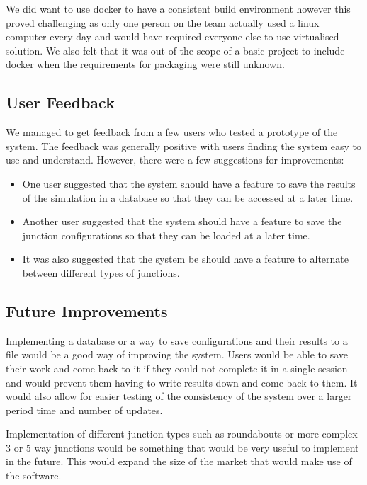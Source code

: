 \documentclass{article}
\begin{document}
    We did want to use docker to have a consistent build environment however this proved challenging as only one person
    on the team actually used a linux computer every day and would have required everyone else to use virtualised solution.
    We also felt that it was out of the scope of a basic project to include docker when the requirements for packaging were
    still unknown.

    \subsection{User Feedback}

    We managed to get feedback from a few users who tested a prototype of the system. The feedback was generally positive with users finding the system easy to use and understand. However, there were a few suggestions for improvements:

    \begin{itemize}
        \item One user suggested that the system should have a feature to save the results of the simulation in a database so that they can be accessed at a later time.
        \item Another user suggested that the system should have a feature to save the junction configurations so that they can be loaded at a later time.
        \item It was also suggested that the system be should have a feature to alternate between different types of junctions.
    \end{itemize}

    \subsection{Future Improvements}

    Implementing a database or a way to save configurations and their results to a file would be a good way of improving
    the system. Users would be able to save their work and come back to it if they could not complete it in a single
    session and would prevent them having to write results down and come back to them. It would also allow for easier
    testing of the consistency of the system over a larger period time and number of updates.

    Implementation of different junction types such as roundabouts or more complex 3 or 5 way junctions would be something
    that would be very useful to implement in the future. This would expand the size of the market that would make use
    of the software.
\end{document}
